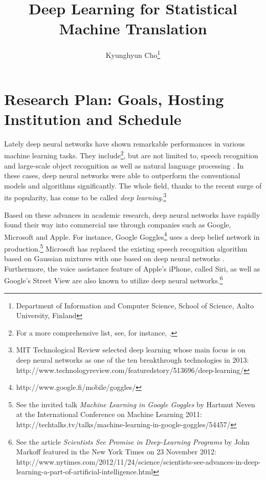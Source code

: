 \documentclass[11pt, oneside]{essay}
\title{Deep Learning for Statistical Machine Translation}
\author{Kyunghyun Cho\thanks{Department of Information and
    Computer Science, School of Science, Aalto University,
             Finland}}
\begin{document}
\vspace{20mm}

\maketitle

\tableofcontents

\vfill

\newpage

\section{Research Plan: Goals, Hosting Institution and Schedule}

Lately deep neural networks have shown remarkable
performances in various machine learning tasks. They
include\footnote{For a more comprehensive list, see, for
instance, \citep{Bengio2013pami}.}, but are not
limited to, speech recognition \citep[see,
e.g.,][]{Hinton2012sp,Dahl2012} and large-scale object
recognition \citep[see, e.g.,][]{Krizhevsky2012,Hinton2012}
as well as natural language processing \citep[see,
e.g.,][]{Socher2011}. In these cases, deep neural networks
were able to outperform the conventional models and
algorithms significantly. The whole field, thanks to the recent
surge of its popularity, has come to be called \textit{deep
    learning}.\footnote{MIT Technological Review selected deep
learning whose main focus is on deep neural networks as one of the ten breakthrough technologies in
2013:
http://www.technologyreview.com/featuredstory/513696/deep-learning/
}

Based on these advances in academic research, deep neural
networks have rapidly found their way into commercial use
through companies such as Google, Microsoft and Apple.  For
instance, Google Goggles\footnote{
http://www.google.fi/mobile/goggles/} uses a deep belief
network in
production.\footnote{See the invited talk \textit{Machine
Learning in Google Goggles} by Hartmut Neven at the
International Conference on Machine Learning 2011:
http://techtalks.tv/talks/machine-learning-in-google-goggles/54457/}
Microsoft has replaced the existing speech recognition
algorithm based on Gaussian mixtures with one based on deep
neural networks \citep{Deng2013}. Furthermore, the voice
assistance feature of Apple's iPhone, called Siri, as well
as Google's Street View are also known to utilize deep
neural networks.\footnote{See the article \textit{Scientists
See Promise in Deep-Learning Programs} by John Markoff
featured in the New York Times on 23 November 2012: \\
http://www.nytimes.com/2012/11/24/science/scientists-see-advances-in-deep-learning-a-part-of-artificial-intelligence.html
}
\end{document}
